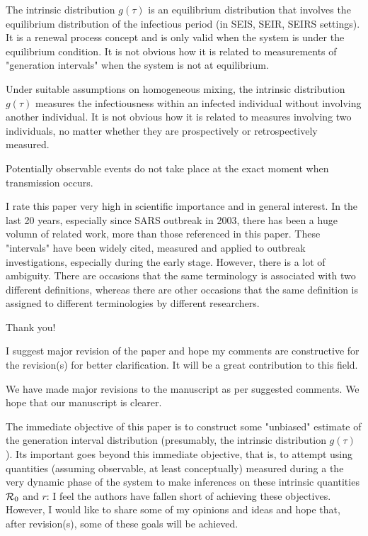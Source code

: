 \documentclass[12pt]{article}
\newcommand{\Rx}[1]{\ensuremath{{\cal R}_{#1}}}
\newcommand{\Ro}{\Rx{0}}
\newcommand{\revtext}{\textsf}
\begin{document}
\revtext{
The intrinsic distribution $g(\tau)$ is an equilibrium distribution that
involves the equilibrium distribution of the infectious period (in SEIS,
SEIR, SEIRS settings). It is a renewal process concept and is only
valid when the system is under the equilibrium condition. It is not
obvious how it is related to measurements of "generation intervals"
when the system is not at equilibrium.
}

\revtext{
 Under suitable assumptions on homogeneous mixing, the intrinsic
distribution $g(\tau)$ measures the infectiousness within an infected individual without involving another individual. It is not obvious how it
is related to measures involving two individuals, no matter whether
they are prospectively or retrospectively measured.
}

\revtext{
Potentially observable events do not take place at the exact moment
when transmission occurs.
}

\revtext{
I rate this paper very high in scientific importance and in general interest.
In the last 20 years, especially since SARS outbreak in 2003, there has
been a huge volumn of related work, more than those referenced in this
paper. These "intervals" have been widely cited, measured and applied to
outbreak investigations, especially during the early stage. However, there
is a lot of ambiguity. There are occasions that the same terminology is
associated with two different definitions, whereas there are other occasions
that the same definition is assigned to different terminologies by different
researchers.
}

Thank you!

\revtext{
I suggest major revision of the paper and hope my comments are
constructive for the revision(s) for better clarification. It will be a
great contribution to this field.
}

We have made major revisions to the manuscript as per suggested comments.
We hope that our manuscript is clearer.

\revtext{
The immediate objective of this paper is to construct some "unbiased" estimate of the generation interval distribution (presumably, the intrinsic distribution $g(\tau)$). Its important goes beyond this immediate objective, that is, to attempt using quantities (assuming observable, at least conceptually) measured during a the very dynamic
phase of the system to make inferences on these intrinsic quantities
$\Ro$ and $r$: I feel the authors have fallen short of achieving these objectives. However, I would like to share some of my opinions and ideas
and hope that, after revision(s), some of these goals will be achieved.
}
\end{document}
